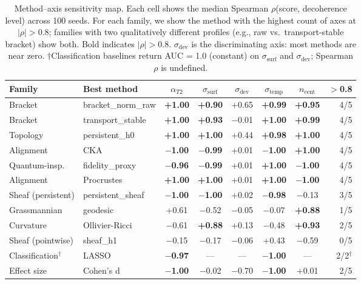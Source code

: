 \documentclass[11pt]{article}
\begin{document}
\begin{table}[t]
\centering
\caption{Method--axis sensitivity map.  Each cell shows the median
  Spearman $\rho$(score, decoherence level) across 100 seeds.  For each
  family, we show the method with the highest count of axes at
  $|\rho| > 0.8$; families with two qualitatively different profiles
  (e.g., raw vs.\ transport-stable bracket) show both.  Bold indicates
  $|\rho| > 0.8$.  $\sigma_\text{dev}$ is the discriminating axis:
  most methods are near zero.  $\dagger$Classification baselines return
  AUC = 1.0 (constant) on $\sigma_\text{surf}$ and $\sigma_\text{dev}$;
  Spearman $\rho$ is undefined.}
\label{tab:sensitivity}
\small
\begin{tabular}{@{}llcccccr@{}}
\toprule
Family & Best method & $\alpha_{T2}$ & $\sigma_\text{surf}$ & $\sigma_\text{dev}$ & $\sigma_\text{temp}$ & $n_\text{cent}$ & $>$0.8 \\
\midrule
Bracket & bracket\_norm\_raw & \textbf{+1.00} & \textbf{+0.90} & +0.65 & \textbf{+0.99} & \textbf{+0.95} & 4/5 \\
Bracket & transport\_stable & \textbf{+1.00} & \textbf{+0.93} & $-$0.01 & \textbf{+1.00} & \textbf{+0.99} & 4/5 \\
Topology & persistent\_h0 & \textbf{+1.00} & \textbf{+1.00} & +0.44 & \textbf{+0.98} & \textbf{+1.00} & 4/5 \\
Alignment & CKA & \textbf{$-$1.00} & \textbf{$-$0.99} & +0.01 & \textbf{$-$1.00} & \textbf{+1.00} & 4/5 \\
Quantum-insp. & fidelity\_proxy & \textbf{$-$0.96} & \textbf{$-$0.99} & +0.01 & \textbf{+1.00} & \textbf{$-$1.00} & 4/5 \\
Alignment & Procrustes & \textbf{+1.00} & \textbf{+1.00} & +0.01 & \textbf{+1.00} & \textbf{$-$1.00} & 4/5 \\
Sheaf (persistent) & persistent\_sheaf & \textbf{$-$1.00} & \textbf{$-$1.00} & +0.02 & \textbf{$-$0.98} & $-$0.13 & 3/5 \\
\midrule
Grassmannian & geodesic & +0.61 & $-$0.52 & $-$0.05 & $-$0.07 & \textbf{+0.88} & 1/5 \\
Curvature & Ollivier-Ricci & $-$0.61 & \textbf{+0.88} & +0.13 & $-$0.48 & \textbf{+0.93} & 2/5 \\
Sheaf (pointwise) & sheaf\_h1 & $-$0.15 & $-$0.17 & $-$0.06 & +0.43 & $-$0.59 & 0/5 \\
\midrule
Classification$^\dagger$ & LASSO & \textbf{$-$0.97} & --- & --- & \textbf{$-$1.00} & --- & 2/2$^\dagger$ \\
Effect size & Cohen's d & \textbf{$-$1.00} & $-$0.02 & $-$0.70 & \textbf{$-$1.00} & +0.01 & 2/5 \\
\bottomrule
\end{tabular}
\end{table}
\end{document}
